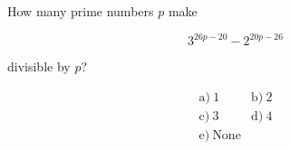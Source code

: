 How many prime numbers \(p\) make



\[
3^{26p-20}-2^{20p-26}
\]

divisible by \(p\)?



\[
\begin{array}{ll}
\text{a)}\ 1 & \text{b)}\ 2 \\
\text{c)}\ 3 & \text{d)}\ 4 \\
\text{e)}\ \text{None}
\end{array}
\]
